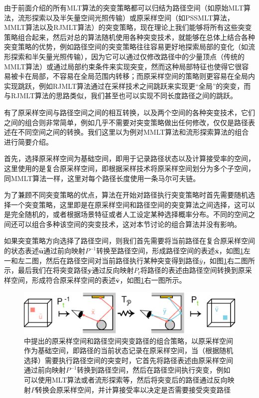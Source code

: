 由于前面介绍的所有MLT算法的突变策略都可以归结为路径空间（如原始MLT算法，流形探索以及半矢量空间光照传输）或原采样空间（如PSSMLT算法，MMLT算法以及RJMLT算法）的突变策略，现在理论上我们能够将所有这些突变策略组合起来，然后对总的算法随机使用各种突变技术，就能够在总体上结合各种突变策略的优势，例如路径空间的突变策略往往容易更好地探索局部的变化（如流形探索和半矢量光照传输），因为它可以通过仅修改路径中的少量顶点（传统的MMLT算法）或通过局部约束条件来实现突变，然而这种局部特征也使得它很容易被卡在局部，不容易在全局范围内转移；而原采样空间的策略则更容易在全局内实现跳跃，例如RJMLT算法通过在采样技术之间跳跃来实现更“全局”的突变，而与RJMLT算法的思路类似，我们甚至也可以实现不同长度路径之间的跳跃。

有了原采样空间与路径空间之间的相互转换，以及两个空间的各种突变技术，它们之间的组合则非常简单，例如几乎不需要对突变策略做出任何修改，仅仅是路径表述在不同空间之间的转换。我们这里以\cite{a:FusingStateSpacesforMarkovChainMonteCarloRendering}为例对MMLT算法和流形探索算法的组合进行简要介绍。

首先，选择原采样空间为基础空间，即用于记录路径状态以及计算接受率的空间，这里使用的是复合原采样空间，即根据采样技术将原采样空间划分为多个子空间，同MMLT算法一样，这里对每个路径长度使用一条马尔可夫链。

为了兼顾不同突变策略的优点，算法在开始对路径执行突变策略时首先需要随机选择一个突变策略，这里即是在原采样空间和路径空间的突变算法之间选择，这可以是完全随机的，或者根据场景特征或者人工设定某种选择概率分布。不同的空间之间还可以组合多种该空间的突变技术，这对本节讨论的组合算法并没有影响。

如果突变策略方向选择了路径空间，则我们首先需要将当前路径在复合原采样空间的状态表述$\bar{\mathbf{u}}$通过前向映射$P^{-1}$转换至路径空间，形成路径空间的表述$\bar{\mathbf{x}}$，如图\ref{f:mlt-fusing}左一和左二图，然后在路径空间对当前路径执行某种突变得到路径$\bar{y}$，如图\ref{f:mlt-fusing}右二图所示，最后我们在将突变路径$\bar{\mathbf{y}}$通过反向映射$P_t$将路径的表述由路径空间转换到原采样空间，形成符合原采样空间的表述$\bar{\mathbf{v}}$，如图\ref{f:mlt-fusing}右一图所示。

\begin{figure}
	\includegraphics[width=1.0\textwidth]{figures/mlt/fusing}
	\caption{\cite{a:FusingStateSpacesforMarkovChainMonteCarloRendering}中提出的原采样空间和路径空间突变路径的组合策略，以原采样空间作为基础空间，即路径的当前状态记录在原采样空间，当（根据随机选择）需要执行路径空间的突变时，它首先将路径表述由原采样空间通过前向映射$P^{-1}$转换到路径空间，然后在路径空间执行突变，例如可以使用MLT算法或者流形探索等，然后将突变后的路径通过反向映射$P$转换会原采样空间，并计算接受率以决定是否需要接受突变路径}
	\label{f:mlt-fusing}
\end{figure}

